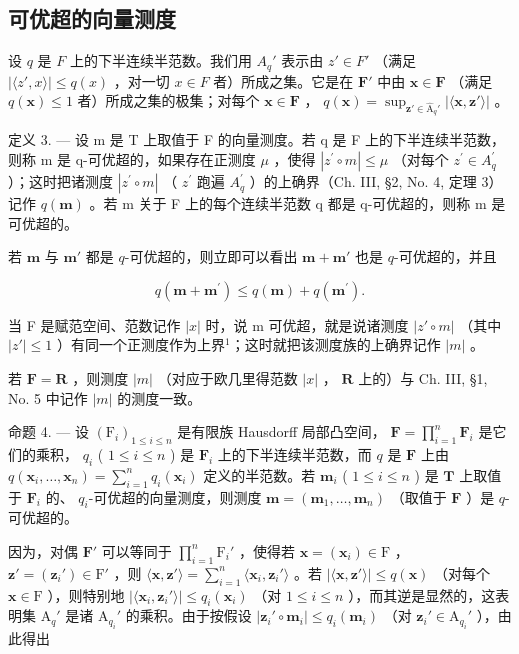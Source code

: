 \subsection{可优超的向量测度}

设 \(q\) 是 \(F\) 上的下半连续半范数。我们用 \(A_q'\) 表示由 \(z' \in F'\) （满足 \(|\langle z', x \rangle| \leqslant q(x)\) ，对一切 \(x \in F\) 者）所成之集。它是在 \(\mathbf{F}'\) 中由 \(\mathbf{x} \in \mathbf{F}\) （满足 \(q(\mathbf{x}) \leqslant 1\) 者）所成之集的极集；对每个 \(\mathbf{x} \in \mathbf{F}\) ， \(q(\mathbf{x}) = \sup_{\mathbf{z}' \in \hat{\mathrm{A}}_q'} |\langle \mathbf{x}, \mathbf{z}' \rangle|\) 。

定义 3. --- 设 m 是 T 上取值于 F 的向量测度。若 q 是 F 上的下半连续半范数，则称 m 是 q-可优超的，如果存在正测度 \(\mu\) ，使得 \(|z^{\prime} \circ m| \leqslant \mu\) （对每个 \(z^{\prime} \in A_{q}^{\prime}\) ）；这时把诸测度 \(|z^{\prime} \circ m|\) （ \(z^{\prime}\) 跑遍 \(A_{q}^{\prime}\) ）的上确界（Ch. III, §2, No. 4, 定理 3）记作 \(q(\mathbf{m})\) 。若 m 关于 F 上的每个连续半范数 q 都是 q-可优超的，则称 m 是可优超的。

若 \(\mathbf{m}\) 与 \(\mathbf{m}'\) 都是 \(q\)-可优超的，则立即可以看出 \(\mathbf{m} + \mathbf{m}'\) 也是 \(q\)-可优超的，并且

\[
q (\mathbf {m} + \mathbf {m} ^ {\prime}) \leqslant q (\mathbf {m}) + q (\mathbf {m} ^ {\prime}).
\]

当 F 是赋范空间、范数记作 \(|x|\) 时，说 m 可优超，就是说诸测度 \(|z'\circ m|\) （其中 \(|z'| \leqslant 1\) ）有同一个正测度作为上界\(^{1}\)；这时就把该测度族的上确界记作 \(|m|\) 。

若 \(\mathbf{F} = \mathbf{R}\) ，则测度 \(|m|\) （对应于欧几里得范数 \(|x|\) ， \(\mathbf{R}\) 上的）与 Ch. III, §1, No. 5 中记作 \(|m|\) 的测度一致。

命题 4. --- 设 \((\mathrm{F}_i)_{1 \leqslant i \leqslant n}\) 是有限族 Hausdorff 局部凸空间， \(\mathbf{F} = \prod_{i=1}^{n} \mathbf{F}_i\) 是它们的乘积， \(q_i\) ( \(1 \leqslant i \leqslant n\) ) 是 \(\mathbf{F}_i\) 上的下半连续半范数，而 \(q\) 是 \(\mathbf{F}\) 上由 \(q(\mathbf{x}_i, \ldots, \mathbf{x}_n) = \sum_{i=1}^{n} q_i(\mathbf{x}_i)\) 定义的半范数。若 \(\mathbf{m}_i\) ( \(1 \leqslant i \leqslant n\) ) 是 \(\mathbf{T}\) 上取值于 \(\mathbf{F}_i\) 的、 \(q_i\)-可优超的向量测度，则测度 \(\mathbf{m} = (\mathbf{m}_1, \ldots, \mathbf{m}_n)\) （取值于 \(\mathbf{F}\) ）是 \(q\)-可优超的。

因为，对偶 \(\mathbf{F}'\) 可以等同于 \(\prod_{i=1}^{n} \mathrm{F}_i'\) ，使得若 \(\mathbf{x} = (\mathbf{x}_i) \in \mathrm{F}\) ， \(\mathbf{z}' = (\mathbf{z}_i') \in \mathrm{F}'\) ，则 \(\langle \mathbf{x}, \mathbf{z}' \rangle = \sum_{i=1}^{n} \langle \mathbf{x}_i, \mathbf{z}_i' \rangle\) 。若 \(|\langle \mathbf{x}, \mathbf{z}' \rangle| \leqslant q(\mathbf{x})\) （对每个 \(\mathbf{x} \in \mathrm{F}\) ），则特别地 \(|\langle \mathbf{x}_i, \mathbf{z}_i' \rangle| \leqslant q_i(\mathbf{x}_i)\) （对 \(1 \leqslant i \leqslant n\) ），而其逆是显然的，这表明集 \(\mathrm{A}_q'\) 是诸 \(\mathrm{A}_{q_i}'\) 的乘积。由于按假设 \(|\mathbf{z}_i' \circ \mathbf{m}_i| \leqslant q_i(\mathbf{m}_i)\) （对 \(\mathbf{z}_i' \in \mathrm{A}_{q_i}'\) ），由此得出

